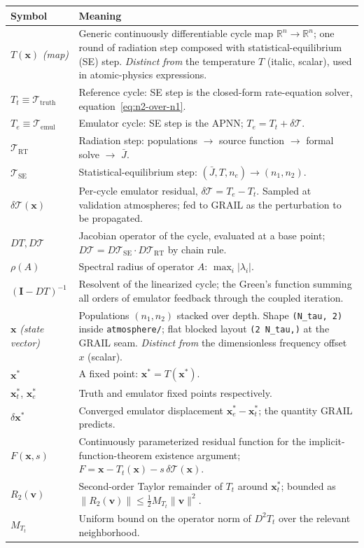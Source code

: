 \documentclass[11pt]{article}
\newcommand{\Tcyc}{\mathcal{T}}
\newcommand{\Trt}{\Tcyc_{\mathrm{RT}}}
\newcommand{\Tse}{\Tcyc_{\mathrm{SE}}}
\newcommand{\dT}{\delta\Tcyc}
\newcommand{\Jbar}{\bar{J}}
\newcommand{\code}[1]{\texttt{#1}}
\begin{document}
\noindent\begin{tabular}{@{}p{1.4in}p{4.8in}@{}}
\toprule
\textbf{Symbol} & \textbf{Meaning} \\ \midrule
$T(\mathbf{x})$ \emph{(map)} & Generic continuously differentiable cycle map $\mathbb{R}^n \to \mathbb{R}^n$; one round of radiation step composed with statistical-equilibrium (SE) step.  \emph{Distinct from} the temperature $T$ (italic, scalar), used in atomic-physics expressions. \\
$T_t \equiv \Tcyc_{\text{truth}}$ & Reference cycle: SE step is the closed-form rate-equation solver, equation~\eqref{eq:n2-over-n1}. \\
$T_e \equiv \Tcyc_{\text{emul}}$ & Emulator cycle: SE step is the APNN; $T_e = T_t + \dT$. \\
$\Trt$ & Radiation step: populations $\to$ source function $\to$ formal solve $\to$ $\Jbar$. \\
$\Tse$ & Statistical-equilibrium step: $(\Jbar, T, n_e) \to (n_1, n_2)$. \\
$\dT(\mathbf{x})$ & Per-cycle emulator residual, $\dT = T_e - T_t$.  Sampled at validation atmospheres; fed to GRAIL as the perturbation to be propagated. \\
$DT, D\Tcyc$ & Jacobian operator of the cycle, evaluated at a base point; $D\Tcyc = D\Tse \cdot D\Trt$ by chain rule. \\
$\rho(A)$ & Spectral radius of operator $A$: $\max_i |\lambda_i|$. \\
$(\mathbf{I}-DT)^{-1}$ & Resolvent of the linearized cycle; the Green's function summing all orders of emulator feedback through the coupled iteration. \\
$\mathbf{x}$ \emph{(state vector)} & Populations $(n_1, n_2)$ stacked over depth.  Shape \code{(N\_tau, 2)} inside \code{atmosphere/}; flat blocked layout \code{(2 N\_tau,)} at the GRAIL seam.  \emph{Distinct from} the dimensionless frequency offset $x$ (scalar). \\
$\mathbf{x}^*$ & A fixed point: $\mathbf{x}^* = T(\mathbf{x}^*)$. \\
$\mathbf{x}_t^*$, $\mathbf{x}_e^*$ & Truth and emulator fixed points respectively. \\
$\delta\mathbf{x}^*$ & Converged emulator displacement $\mathbf{x}_e^* - \mathbf{x}_t^*$; the quantity GRAIL predicts. \\
$F(\mathbf{x}, s)$ & Continuously parameterized residual function for the implicit-function-theorem existence argument; $F = \mathbf{x} - T_t(\mathbf{x}) - s\,\dT(\mathbf{x})$. \\
$R_2(\mathbf{v})$ & Second-order Taylor remainder of $T_t$ around $\mathbf{x}_t^*$; bounded as $\|R_2(\mathbf{v})\| \leq \tfrac{1}{2} M_{T_t} \|\mathbf{v}\|^2$. \\
$M_{T_t}$ & Uniform bound on the operator norm of $D^2 T_t$ over the relevant neighborhood. \\
\bottomrule
\end{tabular}
\end{document}
